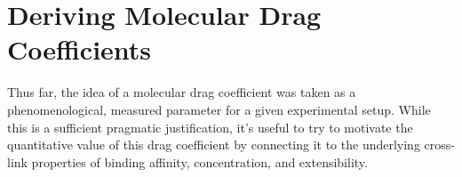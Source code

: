 \documentclass[pre,preprint]{revtex4-1}
\begin{document}
\appendix
\addappheadtotoc

\section{Deriving Molecular Drag Coefficients}
\label{app:drag}
Thus far, the idea of a molecular drag coefficient was taken as a phenomenological, measured parameter for a given experimental setup.  While this is a sufficient pragmatic justification, it's useful to try to motivate the quantitative value of this drag coefficient by connecting it to the underlying cross-link properties of binding affinity, concentration, and extensibility.
\end{document}
